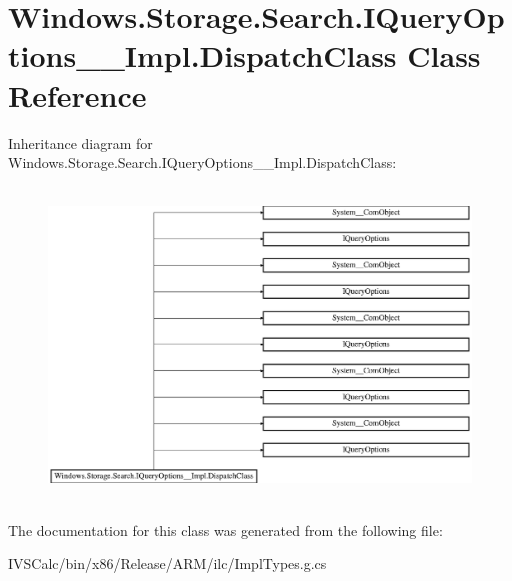 \hypertarget{class_windows_1_1_storage_1_1_search_1_1_i_query_options_____impl_1_1_dispatch_class}{}\section{Windows.\+Storage.\+Search.\+I\+Query\+Options\+\_\+\+\_\+\+Impl.\+Dispatch\+Class Class Reference}
\label{class_windows_1_1_storage_1_1_search_1_1_i_query_options_____impl_1_1_dispatch_class}
Inheritance diagram for Windows.\+Storage.\+Search.\+I\+Query\+Options\+\_\+\+\_\+\+Impl.\+Dispatch\+Class\+:\begin{figure}[H]
\begin{center}
\leavevmode
\includegraphics[height=8.346883cm]{class_windows_1_1_storage_1_1_search_1_1_i_query_options_____impl_1_1_dispatch_class}
\end{center}
\end{figure}


The documentation for this class was generated from the following file\+:\begin{DoxyCompactItemize}
\item 
I\+V\+S\+Calc/bin/x86/\+Release/\+A\+R\+M/ilc/Impl\+Types.\+g.\+cs\end{DoxyCompactItemize}
